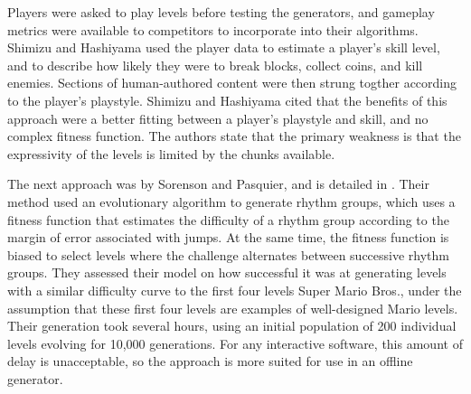 Players were asked to play levels before testing the generators, and gameplay metrics were
available to competitors to incorporate into their algorithms. Shimizu and Hashiyama used
the player data to estimate a player's skill level, and to describe how likely they were to
break blocks, collect coins, and kill enemies. Sections of human-authored content were then
strung togther according to the player's playstyle. Shimizu and Hashiyama cited that the
benefits of this approach were a better fitting between a player's playstyle and skill, and
no complex fitness function. The authors state that the primary weakness is that the
expressivity of the levels is limited by the chunks available.

The next approach was by Sorenson and Pasquier, and is detailed in \cite{sorenson2010}.
Their method used an evolutionary algorithm to generate rhythm groups, which uses a fitness
function that estimates the difficulty of a rhythm group according to the margin of error
associated with jumps. At the same time, the fitness function is biased to select levels 
where the challenge alternates between successive rhythm groups. They assessed their model
on how successful it was at generating levels with a similar difficulty curve to the first
four levels Super Mario Bros., under the assumption that these first four levels are 
examples of well-designed Mario levels. Their generation took several hours, using an 
initial population of 200 individual levels evolving for 10,000 generations. For any
interactive software, this amount of delay is unacceptable, so the approach is more suited
for use in an offline generator.

